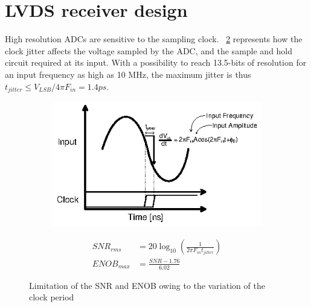 \section{LVDS receiver design}
High resolution ADCs are sensitive to the sampling clock. \figurename~\ref{fig:adc-jitter} represents how the clock jitter affects the voltage sampled by the ADC, and the sample and hold circuit required at its input. With a possibility to reach 13.5-bits of resolution for an input frequency as high as 10 MHz, the maximum jitter is thus $t_{jitter} \leq V_{LSB}/4\pi F_{in} = 1.4 ps$. 

\begin{figure}[htp]
    \centering
    \begin{subfigure}[b]{0.48\textwidth}
        \includegraphics[width=\textwidth]{Chapter5/Figs/lvds/aperture_jitter.ps}
        \label{}
    \end{subfigure}
    \begin{subfigure}[b]{0.48\textwidth}
        \begin{align}
            SNR_{rms}  &= 20\log_{10}\left(\frac{1}{2\pi F_{in}t_{jitter}} \right) \\
            ENOB_{max} &= \frac{SNR-1.76}{6.02} 
        \end{align}
        \vspace{2em}
    \end{subfigure}
    \caption{Limitation of the SNR and ENOB owing to the variation of the clock period}
    \label{fig:adc-jitter}
\end{figure}

